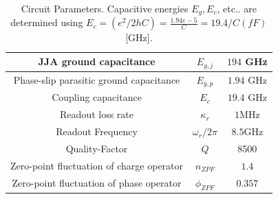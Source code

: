 \documentclass[prx,showpacs,notitlepage,twocolumn,superscriptaddress,nofootinbib,preprintnumbers,floatfix]{revtex4-2}
\begin{document}
\begin{table}[htb]
\begin{center}
\begin{tabular}{|c |c |c|}
\hline
JJA ground capacitance&$E_{g,j}$&$194$ GHz\\ 
\hline
Phase-slip parasitic ground capacitance&$E_{g,p}$&$1.94$ GHz\\ 
\hline
Coupling capacitance&$E_{c}$ &$19.4$ GHz\\ 
\hline
Readout loss rate&$\kappa_r$&$1$MHz\\
\hline
Readout Frequency &$\omega_r/2\pi$&$8.5$GHz\\
\hline
Quality-Factor& $Q$&8500\\
 \hline
  Zero-point fluctuation of charge operator&$n_{ZPF}$&$1.4$\\
 \hline
Zero-point fluctuation of phase operator &$\phi_{ZPF}$&$0.357$\\
 \hline
\end{tabular}
\end{center}

\caption{Circuit Parameters. Capacitive energies $E_g, E_c$, etc.. are determined using $E_c=(e^2/2hC)=\frac{1.94 e-5}{C}=19.4/C(fF) $[GHz].}
\label{tab:params}
\end{table}
\end{document}
